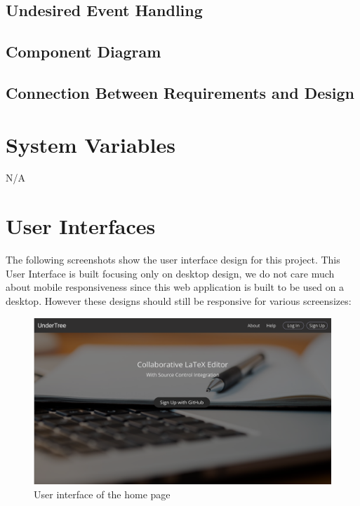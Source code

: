 \documentclass[12pt, titlepage]{article}
\begin{document}
	\subsection{Undesired Event Handling}
	
	
	\subsection{Component Diagram}
	
	\subsection{Connection Between Requirements and Design} \label{SecConnection}
	
	
	\section{System Variables}
	
	N/A
	
	\section{User Interfaces}
	
	The following screenshots show the user interface design for this project. This User Interface is built focusing only on desktop design, we do not care much about mobile responsiveness since this web application is built to be used on a desktop. However these designs should still be responsive for various screensizes:
	
	\begin{figure}[H]
		\centering
		\includegraphics[width=\linewidth]{homePage.png}
		\caption{User interface of the home page}
	\end{figure}
	
\end{document}
